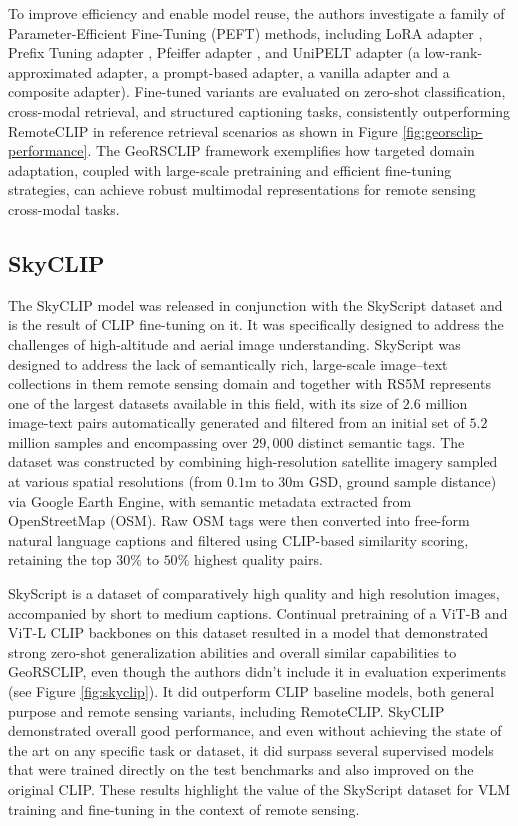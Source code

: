 \documentclass[a4paper, twoside, english]{sapthesis} %
\begin{document}
To improve efficiency and enable model reuse, the authors investigate a family of Parameter-Efficient Fine-Tuning (PEFT) methods, including LoRA adapter \cite{hu2021loralowrankadaptationlarge}, Prefix Tuning adapter \cite{li2021prefix}, Pfeiffer adapter \cite{pfeiffer2020adapterfusion}, and UniPELT adapter \cite{mao2021unipelt} (a low-rank-approximated adapter, a prompt-based adapter, a vanilla adapter and a composite adapter). Fine-tuned variants are evaluated on zero-shot classification, cross-modal retrieval, and structured captioning tasks, consistently outperforming RemoteCLIP in reference retrieval scenarios as shown in Figure \ref{fig:georsclip-performance}. The GeoRSCLIP framework exemplifies how targeted domain adaptation, coupled with large-scale pretraining and efficient fine-tuning strategies, can achieve robust multimodal representations for remote sensing cross-modal tasks.

\subsection{SkyCLIP}

The SkyCLIP model \cite{wang2024skyscript} was released in conjunction with the SkyScript dataset and is the result of CLIP fine-tuning on it. It was specifically designed to address the challenges of high-altitude and aerial image understanding. SkyScript was designed to address the lack of semantically rich, large-scale image–text collections in them remote sensing domain and together with RS5M \cite{zhang2024rs5m} represents one of the largest datasets available in this field, with its size of $2.6$ million image-text pairs automatically generated and filtered from an initial set of $5.2$ million samples and encompassing over $29,000$ distinct semantic tags. The dataset was constructed by combining high-resolution satellite imagery sampled at various spatial resolutions (from $0.1$m to $30$m GSD, ground sample distance) via Google Earth Engine, with semantic metadata extracted from OpenStreetMap (OSM). Raw OSM tags were then converted into free-form natural language captions and filtered using CLIP-based similarity scoring, retaining the top $30\%$ to $50\%$ highest quality pairs.

SkyScript is a dataset of comparatively high quality and high resolution images, accompanied by short to medium captions. Continual pretraining of a ViT-B and ViT-L CLIP backbones on this dataset resulted in a model that demonstrated strong zero-shot generalization abilities and overall similar capabilities to GeoRSCLIP, even though the authors didn't include it in evaluation experiments (see Figure \ref{fig:skyclip}). It did outperform CLIP baseline models, both general purpose and remote sensing variants, including RemoteCLIP. SkyCLIP demonstrated overall good performance, and even without achieving the state of the art on any specific task or dataset, it did surpass several supervised models that were trained directly on the test benchmarks and also improved on the original CLIP. These results highlight the value of the SkyScript dataset for VLM training and fine-tuning in the context of remote sensing.
\end{document}
